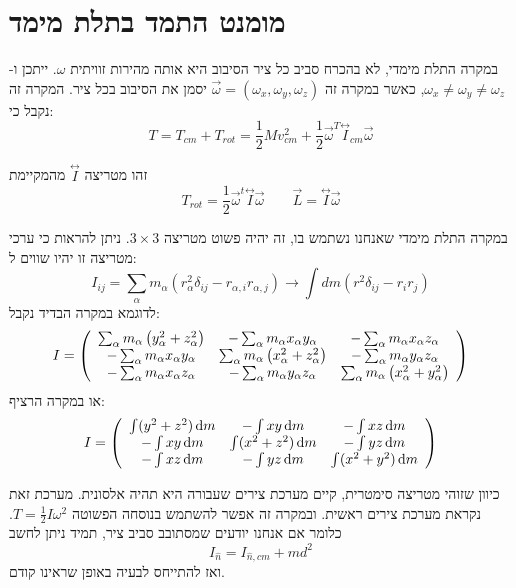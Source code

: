 \documentclass{tstextbook}
\begin{document}
\section{מומנט התמד בתלת מימד}

במקרה התלת מימדי, לא בהכרח סביב כל ציר הסיבוב היא אותה מהירות זוויתית \(\omega\). ייתכן ו-\(\omega_{x}\neq \omega_{y}\neq \omega_{z}\),  כאשר במקרה זה \(\vec{\omega}=\left( \omega _{x},\omega_{y},\omega_{z} \right)\) יסמן את הסיבוב בכל ציר. המקרה זה נקבל כי:
$$T=T_{c m}+T_{r o t}=\frac{1}{2}M v_{c m}^{2}+\frac{1}{2}\vec{\omega}^{T}{\stackrel{\leftrightarrow}{ I}}_{c m}\vec{\omega}$$

\begin{definition}
זהו מטריצה \(\stackrel{\leftrightarrow}{ I}\) מהמקיימת
$$T_{rot}=\frac{1}{2}\vec{\omega}^t\!\!\stackrel{\leftrightarrow}{I}\!\!\vec{\omega}\qquad \vec{L}=\stackrel{\leftrightarrow}{ I}\!\!\vec{\omega}$$

\end{definition}
במקרה התלת מימדי שאנחנו נשתמש בו, זה יהיה פשוט מטריצה \(3\times 3\).
ניתן להראות כי ערכי מטריצה זו יהיו שווים ל:
$$I_{i j}=\sum_{\alpha}m_{\alpha}\left(r_{\alpha}^{2}\delta_{i j}-r_{\alpha,i}r_{\alpha,j}\right)\to\int d m\left(r^{2}\delta_{i j}-r_{i}r_{j}\right)$$
לדוגמא במקרה הבדיד נקבל:
$$I=\left(\begin{array}{c c c}{{\sum_{\alpha}m_{\alpha}\left(y_{\alpha}^{2}+z_{\alpha}^{2}\right)}}&{{-\sum_{\alpha}m_{\alpha}x_{\alpha}y_{\alpha}}}&{{-\sum_{\alpha}m_{\alpha}x_{\alpha}z_{\alpha}}}\\ {{-\sum_{\alpha}m_{\alpha}x_{\alpha}y_{\alpha}}}&{{\sum_{\alpha}m_{\alpha}\left(x_{\alpha}^{2}+z_{\alpha}^{2}\right)}}&{{-\sum_{\alpha}m_{\alpha}y_{\alpha}z_{\alpha}}}\\ {{-\sum_{\alpha}m_{\alpha}x_{\alpha}z_{\alpha}}}&{{-\sum_{\alpha}m_{\alpha}y_{\alpha}z_{\alpha}}}&{{\sum_{\alpha}m_{\alpha}\left(x_{\alpha}^{2}+y_{\alpha}^{2}\right)}}\end{array}\right)$$
או במקרה הרציף:
$$I=\left(\begin{array}{c c c}{\int (y^2+z^2) \, \mathrm{d}m }&{-\int xy \, \mathrm{d}m }&-\int xz \, \mathrm{d}m \\ -\int xy \, \mathrm{d}m &\int (x^2+z^2) \, \mathrm{d}m &-\int yz \, \mathrm{d}m \\ -\int xz \, \mathrm{d}m &-\int yz \, \mathrm{d}m &\int (x^2+y^2) \, \mathrm{d}m \end{array}\right)$$

כיוון שזוהי מטריצה סימטרית, קיים מערכת צירים שעבורה היא תהיה אלסונית. מערכת זאת נקראת מערכת צירים ראשית. ובמקרה זה אפשר להשתמש בנוסחה הפשוטה \(T=\frac{1}{2}I\omega^2\). כלומר אם אנחנו יודעים שמסתובב סביב ציר, תמיד ניתן לחשב $$I_{\hat{n}}=I_{\hat{n},c m}+m d^{2}$$ ואז להתייחס לבעיה באופן שראינו קודם.
\end{document}
